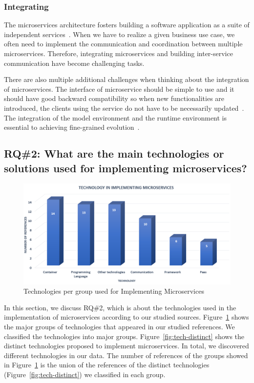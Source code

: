 \subsubsection{Integrating}%

The microservices architecture fosters building a software application as a suite of independent services~\cite{rosa2018}. When we have to realize a given business use case, we often need to implement the communication and coordination between multiple microservices. Therefore, integrating microservices and building inter-service communication have become challenging tasks.

There are also multiple additional challenges when thinking about the integration of microservices. The interface of microservice should be simple to use and it should have good backward compatibility so when new functionalities are introduced, the clients using the service do not have to be necessarily updated~\cite{liu2018, Zhang2019, Kalske2017paper}. The integration of the model environment and the runtime environment is essential to achieving fine-grained evolution~\cite{overeem2018}.




\subsection{RQ\#2: What are the main technologies or solutions used for implementing microservices?}\label{sec:results-rq2}

\begin{figure}[h]
	\centering
	\includegraphics[width=0.5\linewidth]{images/commtechother.png}
	\caption{Technologies per group used for Implementing Microservices}
	\label{fig:tech-group}
\end{figure}	

In this section, we discuss RQ\#2, which is about the technologies used in the implementation of microservices according to our studied sources. Figure~\ref{fig:tech-group} shows the major groups of technologies that appeared in our studied references. We classified the technologies into \techgroupcount major groups.
Figure~\ref{fig:tech-distinct} shows the distinct technologies proposed to implement microservices. In total, we discovered \techcount different technologies in our data. 
The number of references of the groups showed in Figure~\ref{fig:tech-group} is the union of the references of the distinct technologies (Figure~\ref{fig:tech-distinct}) we classified in each group.  

